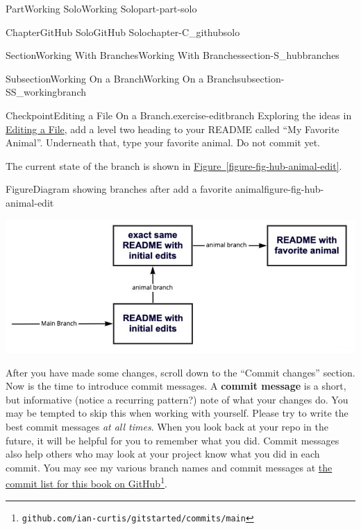 \documentclass[oneside,10pt,]{book}
\newcommand{\xreffont}{\relax}
\newcommand{\terminology}[1]{\textbf{#1}}
\begin{document}
\begin{partptx}{Part}{Working Solo}{}{Working Solo}{}{}{part-part-solo}
\begin{chapterptx}{Chapter}{GitHub Solo}{}{GitHub Solo}{}{}{chapter-C_githubsolo}
\begin{sectionptx}{Section}{Working With Branches}{}{Working With Branches}{}{}{section-S_hubbranches}
\begin{subsectionptx}{Subsection}{Working On a Branch}{}{Working On a Branch}{}{}{subsection-SS_workingbranch}
\begin{inlineexercise}{Checkpoint}{Editing a File On a Branch.}{exercise-editbranch}%
Exploring the ideas in \hyperref[subsection-hub-editfile]{Editing a File}, add a level two heading to your README called ``My Favorite Animal''. Underneath that, type your favorite animal. Do not commit yet.%
\par
The current state of the branch is shown in \hyperref[figure-fig-hub-animal-edit]{Figure~{\xreffont\ref{figure-fig-hub-animal-edit}}}.%
\end{inlineexercise}%
\begin{figureptx}{Figure}{Diagram showing branches after add a favorite animal}{figure-fig-hub-animal-edit}{}%
\begin{image}{0}{1}{0}{}%
\includegraphics[width=\linewidth]{external/hub_animal_edit.pdf}
\end{image}%
\tcblower
\end{figureptx}%
 After you have made some changes, scroll down to the ``Commit changes'' section. Now is the time to introduce commit messages. A \terminology{commit message} is a short, but informative (notice a recurring pattern?) note of what your changes do. You may be tempted to skip this when working with yourself. Please try to write the best commit messages \emph{at all times}. When you look back at your repo in the future, it will be helpful for you to remember what you did. Commit messages also help others who may look at your project know what you did in each commit. You may see my various branch names and commit messages at \href{https://github.com/ian-curtis/gitstarted/commits/main}{the commit list for this book on GitHub}\footnote{\nolinkurl{github.com/ian-curtis/gitstarted/commits/main}\label{fn-SS_workingbranch-g-h}}.%
\par

\end{subsectionptx}
\end{sectionptx}
\end{chapterptx}
\end{partptx}
\end{document}
